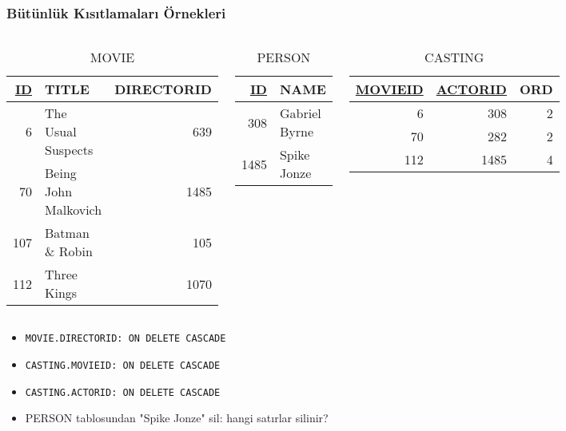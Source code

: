 \documentclass[dvipsnames]{beamer}
\theoremstyle{plain}
\begin{document}
\begin{frame}
  \frametitle{Bütünlük Kısıtlamaları Örnekleri}

  \begin{columns}[t]
    \begin{tiny}
    \begin{table}
      \caption{MOVIE}
      \begin{tabular}{|r|l|r|}\hline
\underline{ID} & TITLE             & DIRECTORID\\[2pt]\hline\hline
          6 & The Usual Suspects   &        639\\\hline
         70 & Being John Malkovich &       1485\\\hline
        107 & Batman \& Robin      &        105\\\hline
        112 & Three Kings          &       1070\\\hline
      \end{tabular}
    \end{table}
    \end{tiny}

    \begin{tiny}
    \begin{table}
      \caption{PERSON}
      \begin{tabular}{|r|l|}\hline
\underline{ID} & NAME\\[2pt]\hline\hline
           308 & Gabriel Byrne\\\hline
          1485 & Spike Jonze  \\\hline
      \end{tabular}
    \end{table}
    \end{tiny}

    \begin{tiny}
    \begin{table}
      \caption{CASTING}
      \begin{tabular}{|r|r|r|}\hline
\underline{MOVIEID} & \underline{ACTORID} & ORD\\[2pt]\hline\hline
                  6 &                 308 &   2\\\hline
                 70 &                 282 &   2\\\hline
                112 &                1485 &   4\\\hline
      \end{tabular}
    \end{table}
    \end{tiny}
  \end{columns}

  \begin{itemize}
    \item \lstinline!MOVIE.DIRECTORID: ON DELETE CASCADE!
    \item \lstinline!CASTING.MOVIEID: ON DELETE CASCADE!
    \item \lstinline!CASTING.ACTORID: ON DELETE CASCADE!
    \smallskip
    \item PERSON tablosundan "Spike Jonze" sil: hangi satırlar silinir?
  \end{itemize}
\end{frame}
\end{document}
